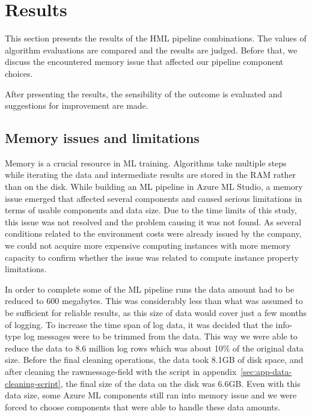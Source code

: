 

\section{Results}\label{sec:results}

This section presents the results of the HML pipeline combinations.
The values of algorithm evaluations are compared
and the results are judged.
Before that,
we discuss the encountered memory issue
that affected our pipeline component choices.

After presenting the results,
the sensibility of the outcome is evaluated
and suggestions for improvement are made.




\subsection{Memory issues and limitations}\label{subsec:res-memory-issues}

Memory is a crucial resource in ML training.
Algorithms take multiple steps while iterating the data
and intermediate results are stored in the RAM rather than on the disk.
While building an ML pipeline in Azure ML Studio,
a memory issue emerged
that affected several components
and caused serious limitations
in terms of usable components and data size.
Due to the time limits of this study,
this issue was not resolved
and the problem causing it was not found.
As several conditions related to the environment costs
were already issued by the company,
we could not acquire more expensive computing instances
with more memory capacity to confirm
whether the issue was related to compute instance property limitations.

In order to complete some of the ML pipeline runs
the data amount had to be reduced to 600 megabytes.
This was considerably less than what was assumed to be sufficient
for reliable results,
as this size of data would cover just a few months of logging.
To increase the time span of log data,
it was decided that the info-type log messages were to be trimmed from the data.
This way we were able to reduce the data to 8.6 million log rows
which was about 10\% of the original data size.
Before the final cleaning operations,
the data took 8.1GB of disk space,
and after cleaning the rawmessage-field with the script in appendix~\ref{sec:app-data-cleaning-script},
the final size of the data on the disk was 6.6GB\@.
Even with this data size,
some Azure ML components still ran into memory issue
and we were forced to choose components
that were able to handle these data amounts.

